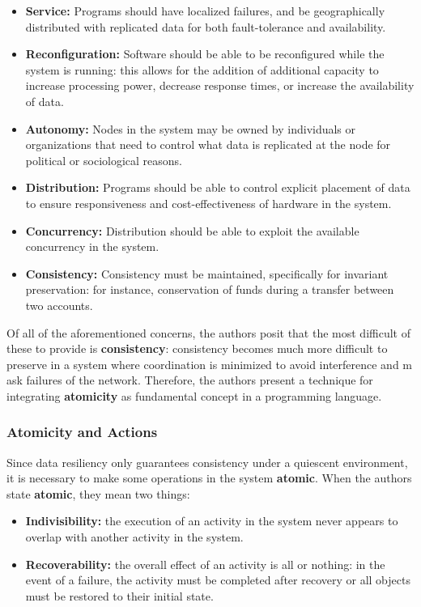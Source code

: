 \begin{itemize}
\item \textbf{Service:} Programs should have localized failures, and be geographically distributed with replicated data for both fault-tolerance and availability.
\item \textbf{Reconfiguration:} Software should be able to be reconfigured while the system is running: this allows for the addition of additional capacity to increase processing power, decrease response times, or increase the availability of data.
\item \textbf{Autonomy:} Nodes in the system may be owned by individuals or organizations that need to control what data is replicated at the node for political or sociological reasons.
\item \textbf{Distribution:} Programs should be able to control explicit placement of data to ensure responsiveness and cost-effectiveness of hardware in the system.
\item \textbf{Concurrency:} Distribution should be able to exploit the available concurrency in the system.
\item \textbf{Consistency:} Consistency must be maintained, specifically for invariant preservation: for instance, conservation of funds during a transfer between two accounts.
\end{itemize}

Of all of the aforementioned concerns, the authors posit that the most difficult of these to provide is \textbf{consistency}: consistency becomes much more difficult to preserve in a system where coordination is minimized to avoid interference and m ask failures of the network.  Therefore, the authors present a technique for integrating \textbf{atomicity} as fundamental concept in a programming language.

\subsubsection{Atomicity and Actions}

Since data resiliency only guarantees consistency under a quiescent environment, it is necessary to make some operations in the system \textbf{atomic}.  When the authors state \textbf{atomic}, they mean two things:

\begin{itemize}
\item \textbf{Indivisibility:} the execution of an activity in the system never appears to overlap with another activity in the system.
\item \textbf{Recoverability:} the overall effect of an activity is all or nothing: in the event of a failure, the activity must be completed after recovery or all objects must be restored to their initial state.	
\end{itemize}


